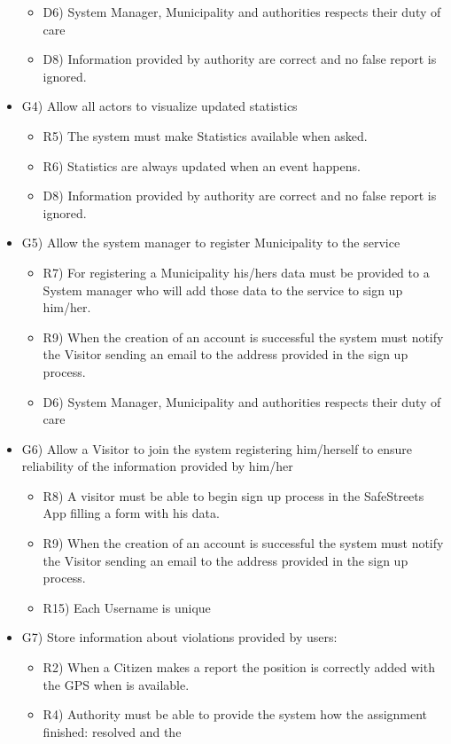 \begin{itemize}
\begin{itemize}
 \item D6) System Manager, Municipality and authorities respects their duty of care
 \item D8) Information provided by authority are correct and no false report is ignored.
\end{itemize}
\item G4) Allow all actors to visualize updated statistics
\begin{itemize}
\item R5) The system must make Statistics available when asked.
\item R6) Statistics are always updated when an event happens.
 \item D8) Information provided by authority are correct and no false report is ignored.
\end{itemize}
\item G5) Allow the system manager to register Municipality to the service
\begin{itemize}
\item R7) For registering a Municipality his/hers data must be provided to a System manager who will add those data to the service to sign up him/her.
\item R9) When the creation of an account is successful the system must notify the Visitor sending an email to the address provided in the sign up process.
\item D6) System Manager, Municipality and authorities respects their duty of care
\end{itemize}
\item G6) Allow a Visitor to join the system registering him/herself to ensure reliability of the information provided by him/her
\begin{itemize}
\item R8) A visitor must be able to begin sign up process in the SafeStreets App filling a form with his
data.
\item R9) When the creation of an account is successful the system must notify the Visitor sending an
email to the address provided in the sign up process.
 \item R15) Each Username is unique
\end{itemize}
\item G7) Store information about violations provided by users:
\begin{itemize}
 \item R2) When a Citizen makes a report the position is correctly added with the GPS when is available.
 \item R4) Authority must be able to provide the system how the assignment finished: resolved and the

\end{itemize}
\end{itemize}
